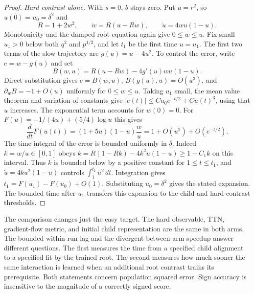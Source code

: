 \begin{proof}
\emph{Hard contrast alone.}
With $s=0$, $b$ stays zero. Put $u=r^2$, so $u(0)=u_0=\delta^2$ and
\[
 R=1+2w^2,\qquad \dot w=R(u-Rw),\qquad \dot u=4wu(1-u).
\]
Monotonicity and the damped root equation again give $0\le w\le u$.
Fix small $u_1>0$ below both $q^2$ and $p^{1/2}$, and let $t_1$ be the
first time $u=u_1$. The first two terms of the slow trajectory are
$g(u)=u-4u^2$. To control the error, write $e=w-g(u)$ and set
\[
 B(w,u)=R(u-Rw)-4g'(u)wu(1-u).
\]
Direct substitution gives $\dot e=B(w,u)$,
$B(g(u),u)=O(u^3)$, and $\partial_wB=-1+O(u)$ uniformly for $0\le w\le u$.
Taking $u_1$ small, the mean value theorem and variation of constants
give $|e(t)|\le C u_0e^{-t/2}+Cu(t)^3$, using that $u$ increases.
The exponential term accounts for $w(0)=0$. For
$F(u)=-1/(4u)+(5/4)\log u$ this gives
\[
 \frac{d}{dt}F(u(t))=(1+5u)(1-u)\frac{w}{u}
  =1+O(u^2)+O(e^{-t/2}).
\]
The time integral of the error is bounded uniformly in $\delta$. Indeed
$k=w/u\in[0,1]$ obeys
$\dot k=R(1-Rk)-4k^2u(1-u)\ge1-C_1 k$ on this interval.
Thus $k$ is bounded below by a positive constant for $1\le t\le t_1$,
and $\dot u=4ku^2(1-u)$ controls $\int_1^{t_1}u^2\,dt$.
Integration gives $t_1=F(u_1)-F(u_0)+O(1)$. Substituting
$u_0=\delta^2$ gives the stated expansion. The bounded time after $u_1$
transfers this expansion to the child and hard-contrast thresholds.
\end{proof}

The comparison changes just the easy target. The hard observable, TTN,
gradient-flow metric, and initial child representation are the same in
both arms. The bounded within-run lag and the divergent between-arm
speedup answer different questions. The first measures the time from a specified
child alignment to a specified fit by the trained root. The
second measures how much sooner the same interaction is learned when an
additional root contrast trains its prerequisite. Both statements concern
population squared error. Sign accuracy is insensitive to the magnitude
of a correctly signed score.
